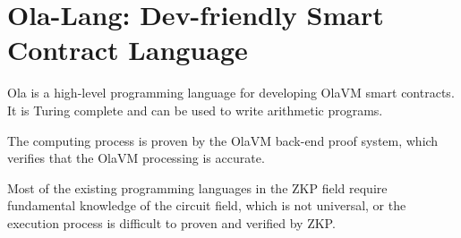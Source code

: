 \section{Ola-Lang: Dev-friendly Smart Contract Language}\label{sec:ola-lang}

Ola is a high-level programming language for developing OlaVM smart contracts.
It is Turing complete and can be used to write arithmetic programs.

The computing process is proven by the OlaVM back-end proof system, which verifies that the OlaVM processing is accurate.

Most of the existing programming languages in the ZKP field require fundamental knowledge of the circuit field,
which is not universal, or the execution process is difficult to proven and verified by ZKP.




